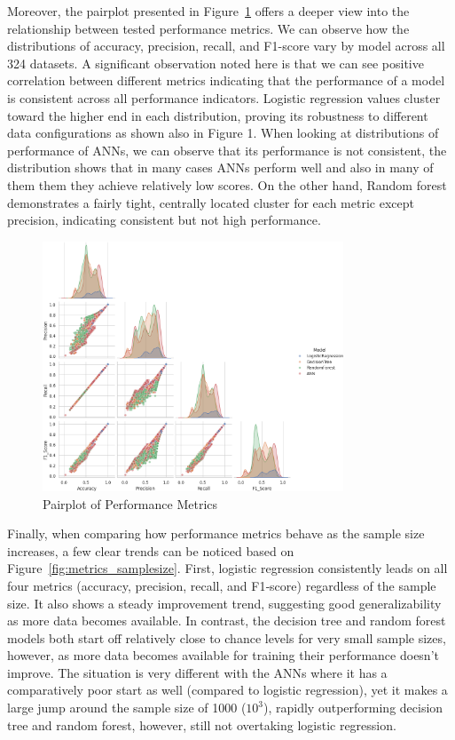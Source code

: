 \documentclass[12pt]{article}
\begin{document}
Moreover, the pairplot presented in Figure~\ref{fig:pair_plot} offers a deeper view into the relationship between tested performance metrics. We can observe how the distributions of accuracy, precision, recall, and F1-score vary by model across all 324 datasets. A significant observation noted here is that we can see positive correlation between different metrics indicating that the performance of a model is consistent across all performance indicators. Logistic regression values cluster toward the higher end in each distribution, proving its robustness to different data configurations as shown also in Figure 1. When looking at distributions of performance of ANNs, we can observe that its performance is not consistent, the distribution shows that in many cases ANNs perform well and also in many of them them they achieve relatively low scores. On the other hand, Random forest demonstrates a fairly tight, centrally located cluster for each metric except precision, indicating consistent but not high performance.

\begin{figure}[h]
 \centering
    \includegraphics[width=0.8\textwidth]{fig/pair plots full.png}
    \caption{Pairplot of Performance Metrics}
    \label{fig:pair_plot}
\end{figure}

Finally, when comparing how performance metrics behave as the sample size increases, a few clear trends can be noticed based on Figure~\ref{fig:metrics_samplesize}. First, logistic regression consistently leads on all four metrics (accuracy, precision, recall, and F1‐score) regardless of the sample size. It also shows a steady improvement trend, suggesting good generalizability as more data becomes available. In contrast, the decision tree and random forest models both start off relatively close to chance levels for very small sample sizes, however, as more data becomes available for training their performance doesn't improve. The situation is very different with the ANNs where it has a comparatively poor start as well (compared to logistic regression), yet it makes a large jump around the sample size of 1000 (\(10^3\)), rapidly outperforming decision tree and random forest, however, still not overtaking logistic regression.  
\end{document}
